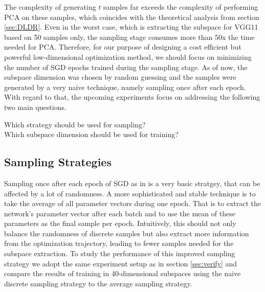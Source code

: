 \documentclass[11pt, a4paper]{article}
\begin{document}
The complexity of generating $t$ samples far exceeds the complexity of performing PCA on these samples, which coincides with the theoretical analysis from section \ref{sec:DLDR}. Even in the worst case, which is extracting the subspace for VGG11 based on 50 samples only, the sampling stage consumes more than 50x the time needed for PCA. Therefore, for our purpose of designing a cost efficient but powerful low-dimensional optimization method, we should focus on minimizing the number of SGD epochs trained during the sampling stage. As of now, the subspace dimension was chosen by random guessing and the samples were generated by a very naive technique, namely sampling once after each epoch. With regard to that, the upcoming experiments focus on addressing the following two main questions.

\begin{center}
Which strategy should be used for sampling? \\
Which subspace dimension should be used for training? \\
\end{center}

\subsection{Sampling Strategies}

Sampling once after each epoch of SGD as in \cite{Paper} is a very basic stratgey, that can be affected by a lot of randomness. A more sophisticated and stable technique is to take the average of all parameter vectors during one epoch. That is to extract the network's parameter vector after each batch and to use the mean of these parameters as the final sample per epoch. Intuitively, this should not only balance the randomness of discrete samples but also extract more information from the optimization trajectory, leading to fewer samples needed for the subspace extraction. To study the performance of this improved sampling strategy we adopt the same experiment setup as in section \ref{sec:verify} and compare the results of training in 40-dimensional subspaces using the naive discrete sampling strategy to the average sampling strategy.
\end{document}
